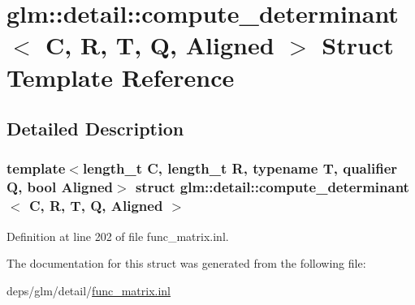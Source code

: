 \hypertarget{structglm_1_1detail_1_1compute__determinant}{}\section{glm\+:\+:detail\+:\+:compute\+\_\+determinant$<$ C, R, T, Q, Aligned $>$ Struct Template Reference}
\label{structglm_1_1detail_1_1compute__determinant}


\subsection{Detailed Description}
\subsubsection*{template$<$length\+\_\+t C, length\+\_\+t R, typename T, qualifier Q, bool Aligned$>$\newline
struct glm\+::detail\+::compute\+\_\+determinant$<$ C, R, T, Q, Aligned $>$}



Definition at line 202 of file func\+\_\+matrix.\+inl.



The documentation for this struct was generated from the following file\+:\begin{DoxyCompactItemize}
\item 
deps/glm/detail/\hyperlink{func__matrix_8inl}{func\+\_\+matrix.\+inl}\end{DoxyCompactItemize}
